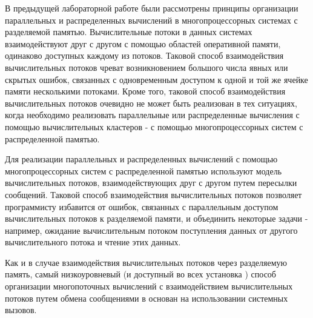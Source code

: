 

В предыдущей лабораторной работе были рассмотрены принципы организации параллельных и распределенных вычислений в многопроцессорных системах с разделяемой памятью. Вычислительные потоки в данных системах взаимодействуют друг с другом с помощью областей оперативной памяти, одинаково доступных каждому из потоков. Таковой способ взаимодействия вычислительных потоков чреват возникновением большого числа явных или скрытых ошибок, связанных с одновременным доступом к одной и той же ячейке памяти несколькими потоками. Кроме того, таковой способ взаимодействия вычислительных потоков очевидно не может быть реализован в тех ситуациях, когда необходимо реализовать параллельные или распределенные вычисления с помощью вычислительных кластеров - с помощью многопроцессорных систем с распределенной памятью.

Для реализации параллельных и распределенных вычислений с помощью многопроцессорных систем с распределенной памятью используют модель вычислительных потоков, взаимодействующих друг с другом путем пересылки сообщений. Таковой способ взаимодействия вычислительных потоков позволяет программисту избавится от ошибок, связанных с параллельным доступом вычислительных потоков к разделяемой памяти, и объединить некоторые задачи - например, ожидание вычислительным потоком поступления данных от другого вычислительного потока и чтение этих данных.


Как и в случае взаимодействия вычислительных потоков через разделяемую память, самый низкоуровневый (и доступный во всех установка \gl) способ организации многопоточных вычислений с взаимодействием вычислительных потоков путем обмена сообщениями в \gl основан на использовании системных вызовов.

